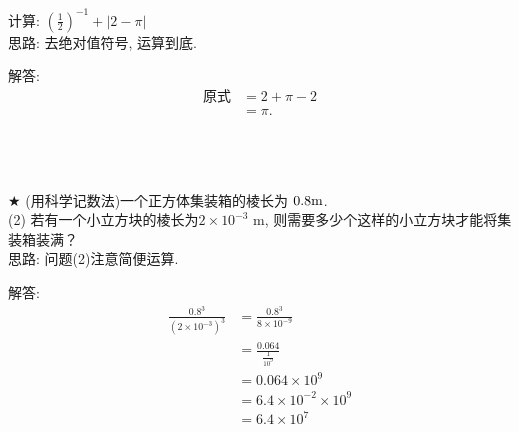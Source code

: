 \begin{comment}
\item {
    (注意: 除号使用分数形式) 已知$10^{-m}=a, 10^{-n}=b$($m, n$是整数), 求$10^{2m-3n}$的值(用含有$a, b$的代数式表示). 
    \\ \\ \\
}
\end{comment}

\begin{comment}
\item {
    已知$2^x=3, 2^y=6, 2^z=12$, 判断下列有关$x, y, z$的数量关系式的对错. \\
    (1) $x+z=2y$\\
    (2) $x+y+3=2z$\\
    (3) $4x=z$\\
    (4) $x+1=y$
    \\ \\
}
\end{comment}

\item {
    计算: $ (\frac{1}{2})^{-1} + \lvert 2-\pi \rvert $
    \ifshowSolution
    \fangsong{}
    \\
    思路: 去绝对值符号, 运算到底. 

    解答: 
    \begin{align*}
        \mbox{原式} &= 2 + \pi - 2\\
        &= \pi. 
    \end{align*}
    \else
        \\ \\ \\
    \fi
}

\begin{comment}
\item {
    已知$(x+2)^{x+5}=1$, 求$x$. 
    \\ \\ \\
}
\end{comment}

\item {
    $\bigstar$
    (用科学记数法)一个正方体集装箱的棱长为 $0. 8 \rm{m}$. \\
    (2) 若有一个小立方块的棱长为$2\times 10^{-3} $ m, 则需要多少个这样的小立方块才能将集装箱装满？
    \ifshowSolution
    \fangsong{}
    \\
    思路: 问题(2)注意简便运算. 

    解答:
    \begin{align*}
        \frac{0. 8^3} {(2\times 10^{-3})^3} &= \frac{0. 8^3} {8\times 10^{-9}}\\
        &= \frac{0. 064} {\frac{1}{10^9}}\\
        &= 0. 064\times 10^9\\
        &= 6. 4\times 10^{-2}\times 10^9\\
        &= 6. 4\times 10^7\\
    \end{align*}
    \else
        \\ \\ \\
    \fi
}


